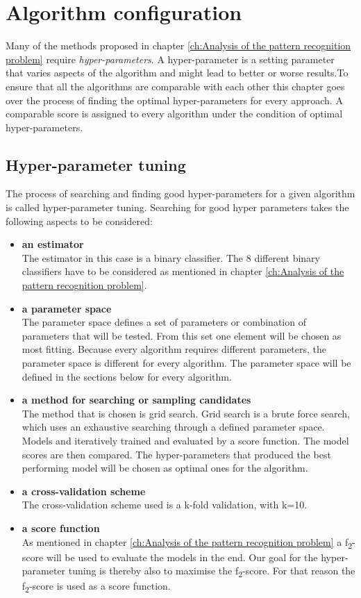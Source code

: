 \chapter{Algorithm configuration}
\label{ch:Algorithm configuration}
Many of the methods proposed in chapter \ref{ch:Analysis of the pattern recognition problem} require \emph{hyper-parameters}.  A hyper-parameter is a setting parameter that varies aspects of the algorithm and might lead to better or worse results.To ensure that all the algorithms are comparable with each other this chapter goes over the process of finding the optimal hyper-parameters for every approach. A comparable score is assigned to every algorithm under the condition of optimal hyper-parameters.
\section*{Hyper-parameter tuning}
The process of searching and finding good hyper-parameters for a given algorithm is called hyper-parameter tuning. Searching for good hyper parameters takes the following aspects to be considered:
\begin{itemize}
\item{ \textbf{an estimator}} \\
The estimator in this case is a binary classifier. The 8 different binary classifiers have to be considered as mentioned in chapter \ref{ch:Analysis of the pattern recognition problem}.
\item{\textbf{a parameter space}} \\
The parameter space defines a set of parameters or combination of parameters that will be tested. From this set one element will be chosen as most fitting. Because every algorithm requires different parameters, the parameter space is different for every algorithm. The parameter space will be defined in the sections below for every algorithm. 
\item{\textbf{a method for searching or sampling candidates}}\\
The method that is chosen is grid search. Grid search is a brute force search, which uses an exhaustive searching through a defined parameter space. Models and iteratively trained and evaluated by a score function. The model scores are then compared. The hyper-parameters that produced the best performing model will be chosen as optimal ones for the algorithm.
\item{\textbf{a cross-validation scheme}} \\
The cross-validation scheme used is a k-fold validation, with k=10.
\item{\textbf{a score function}}\\
As mentioned in chapter \ref{ch:Analysis of the pattern recognition problem}  a  f\textsubscript{2}-score will be used to evaluate the models in the end. Our goal for the hyper-parameter tuning is thereby also to maximise the  f\textsubscript{2}-score. For that reason the  f\textsubscript{2}-score is used as a score function.
\end{itemize}

